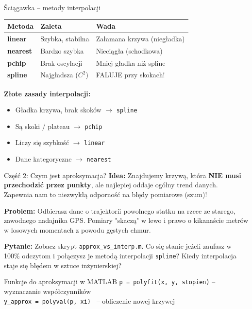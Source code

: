 \documentclass[11pt,aspectratio=169,table]{beamer}
\begin{document}
\begin{frame}{Ściągawka – metody interpolacji}
	\begin{table}
		\centering
		\renewcommand{\arraystretch}{1.5}
		\begin{tabular}{|p{2.5cm}|p{4.5cm}|p{4.5cm}|}
			\hline
			\rowcolor{gray!20}
			\textbf{Metoda} & \textbf{Zaleta} & \textbf{Wada} \\
			\hline
			\textbf{linear} & Szybka, stabilna & Załamana krzywa (niegładka) \\
			\hline
			\textbf{nearest} & Bardzo szybka & Nieciągła (schodkowa) \\
			\hline
			\textbf{pchip} & Brak oscylacji & Mniej gładka niż spline \\
			\hline
			\textbf{spline} & Najgładsza ($C^2$) & \alert{FALUJE przy skokach!} \\
			\hline
		\end{tabular}
	\end{table}
	
	\vspace{0.5cm}
	\textbf{Złote zasady interpolacji:}
	\begin{itemize}
		\item Gładka krzywa, brak skoków $\rightarrow$ \alert{\texttt{spline}}
		\item Są skoki / plateau $\rightarrow$ \alert{\texttt{pchip}}
		\item Liczy się szybkość $\rightarrow$ \alert{\texttt{linear}}
		\item Dane kategoryczne $\rightarrow$ \alert{\texttt{nearest}}
	\end{itemize}
\end{frame}

\begin{frame}{Część 2: Czym jest aproksymacja?}
	\textbf{Idea:} Znajdujemy krzywą, która \textbf{NIE musi przechodzić przez punkty}, ale najlepiej oddaje ogólny trend danych. Zapewnia nam to niezwykłą odporność na błędy pomiarowe (szum)!
	
	\vspace{-0.6em}
	\begin{tcolorbox}[colback=blue!5!white,colframe=blue!75!black,title=Sytuacja z życia: Tani odbiornik GPS]
		\textbf{Problem:} Odbierasz dane o trajektorii powolnego statku na rzece ze starego, zawodnego nadajnika GPS. Pomiary "skaczą" w lewo i prawo o kikanaście metrów w losowych momentach z powodu gęstych chmur. 
		
		\textbf{Pytanie:} Zobacz skrypt \texttt{approx\_vs\_interp.m}. Co się stanie jeżeli zaufasz w 100\% odczytom i połączysz je metodą interpolacji \texttt{spline}? Kiedy interpolacja staje się błędem w sztuce inżynierskiej?
	\end{tcolorbox}
	\vspace{-0.5em}
	\begin{block}{Funkcje do aproksymacji w MATLAB}
		\centering
		\texttt{p = polyfit(x, y, stopien)} \quad -- wyznaczanie współczynników \\
		\texttt{y\_approx = polyval(p, xi)} \quad \,\,\,-- obliczenie nowej krzywej
	\end{block}
\end{frame}
\end{document}
